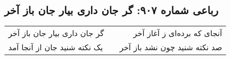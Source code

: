 \begin{center}
\section*{رباعی شماره ۹۰۷: گر جان داری بیار جان باز آخر}
\label{sec:0907}
\begin{longtable}{l p{0.5cm} r}
گر جان داری بیار جان باز آخر
&&
آنجای که برده‌ای ز آغاز آخر
\\
یک نکته شنید جان از آنجا آمد
&&
صد نکته شنید چون نشد باز آخر
\\
\end{longtable}
\end{center}
